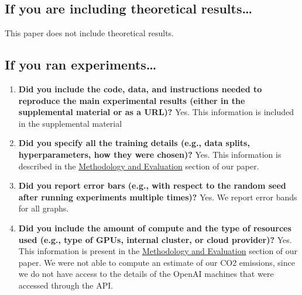 \documentclass{article}
\begin{document}
\subsection{If you are including theoretical results\dots}
This paper does not include theoretical results.
\subsection{If you ran experiments\dots}
\begin{enumerate}
  \item \textbf{Did you include the code, data, and instructions needed to reproduce the main experimental results (either in the supplemental material or as a URL)?}
        Yes. This information is included in the supplemental material
  \item \textbf{Did you specify all the training details (e.g., data splits, hyperparameters, how they were chosen)?}
        Yes. This information is described in the \hyperref[para:methodology]{Methodology and Evaluation} section of our paper.
  \item \textbf{Did you report error bars (e.g., with respect to the random seed after running experiments multiple times)?}
        Yes. We report error bands for all graphs.
  \item \textbf{Did you include the amount of compute and the type of resources used (e.g., type of GPUs, internal cluster, or cloud provider)?}
        Yes. This information is present in the \hyperref[para:methodology]{Methodology and Evaluation} section of our paper. We were not able to compute an estimate of our CO2 emissions, since we do not have access to the details of the OpenAI machines that were accessed through the API.
\end{enumerate}
\end{document}
